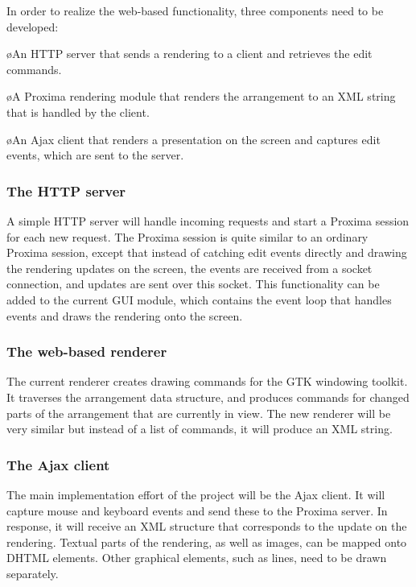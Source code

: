 \documentclass[10pt]{article}
\begin{document}
In order to realize the web-based functionality, three components need to be developed:

\bl
\o An HTTP server that sends a rendering to a client and retrieves the edit commands. 

\o A Proxima rendering module that renders the arrangement to an XML string that is handled by the client.

\o An Ajax client that renders a presentation on the screen and captures edit events, which are sent to the server.
\el

\subsubsection{The HTTP server}

A simple HTTP server will handle incoming requests and start a Proxima session for each new request. The Proxima session is quite similar to an ordinary Proxima session, except that instead of catching edit events directly and drawing the rendering updates on the screen, the events are received from a socket connection, and updates are sent over  this socket. This functionality can be added to the current GUI module, which contains the event loop that handles events and draws the rendering onto the screen. 
 
\subsubsection{The web-based renderer}

The current renderer creates drawing commands for the GTK windowing toolkit. It traverses the arrangement data structure, and produces commands for changed parts of the arrangement that are currently in view. The new renderer will be very similar but instead of a list of commands, it will produce an XML string.

\subsubsection{The Ajax client}

The main implementation effort of the project will be the Ajax client. It will capture mouse and keyboard events and send these to the Proxima server. In response, it will receive an XML structure that corresponds to the update on the rendering. Textual parts of the rendering, as well as images, can be mapped onto DHTML elements. Other graphical elements, such as lines, need to be drawn separately.
\end{document}
